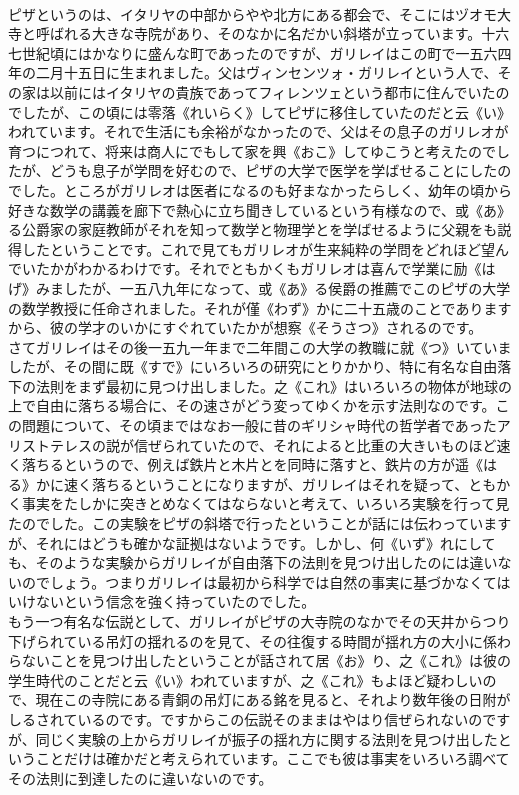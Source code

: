 \documentclass[8pt]{extreport}
\begin{document}
\begin{CJK}{UTF8}{min}
\\	ピザというのは、イタリヤの中部からやや北方にある都会で、そこにはヅオモ大寺と呼ばれる大きな寺院があり、そのなかに名だかい斜塔が立っています。十六七世紀頃にはかなりに盛んな町であったのですが、ガリレイはこの町で一五六四年の二月十五日に生まれました。父はヴィンセンツォ・ガリレイという人で、その家は以前にはイタリヤの貴族であってフィレンツェという都市に住んでいたのでしたが、この頃には零落《れいらく》してピザに移住していたのだと云《い》われています。それで生活にも余裕がなかったので、父はその息子のガリレオが育つにつれて、将来は商人にでもして家を興《おこ》してゆこうと考えたのでしたが、どうも息子が学問を好むので、ピザの大学で医学を学ばせることにしたのでした。ところがガリレオは医者になるのも好まなかったらしく、幼年の頃から好きな数学の講義を廊下で熱心に立ち聞きしているという有様なので、或《あ》る公爵家の家庭教師がそれを知って数学と物理学とを学ばせるように父親をも説得したということです。これで見てもガリレオが生来純粋の学問をどれほど望んでいたかがわかるわけです。それでともかくもガリレオは喜んで学業に励《はげ》みましたが、一五八九年になって、或《あ》る侯爵の推薦でこのピザの大学の数学教授に任命されました。それが僅《わず》かに二十五歳のことでありますから、彼の学才のいかにすぐれていたかが想察《そうさつ》されるのです。
\\	さてガリレイはその後一五九一年まで二年間この大学の教職に就《つ》いていましたが、その間に既《すで》にいろいろの研究にとりかかり、特に有名な自由落下の法則をまず最初に見つけ出しました。之《これ》はいろいろの物体が地球の上で自由に落ちる場合に、その速さがどう変ってゆくかを示す法則なのです。この問題について、その頃まではなお一般に昔のギリシャ時代の哲学者であったアリストテレスの説が信ぜられていたので、それによると比重の大きいものほど速く落ちるというので、例えば鉄片と木片とを同時に落すと、鉄片の方が遥《はる》かに速く落ちるということになりますが、ガリレイはそれを疑って、ともかく事実をたしかに突きとめなくてはならないと考えて、いろいろ実験を行って見たのでした。この実験をピザの斜塔で行ったということが話には伝わっていますが、それにはどうも確かな証拠はないようです。しかし、何《いず》れにしても、そのような実験からガリレイが自由落下の法則を見つけ出したのには違いないのでしょう。つまりガリレイは最初から科学では自然の事実に基づかなくてはいけないという信念を強く持っていたのでした。
\\	もう一つ有名な伝説として、ガリレイがピザの大寺院のなかでその天井からつり下げられている吊灯の揺れるのを見て、その往復する時間が揺れ方の大小に係わらないことを見つけ出したということが話されて居《お》り、之《これ》は彼の学生時代のことだと云《い》われていますが、之《これ》もよほど疑わしいので、現在この寺院にある青銅の吊灯にある銘を見ると、それより数年後の日附がしるされているのです。ですからこの伝説そのままはやはり信ぜられないのですが、同じく実験の上からガリレイが振子の揺れ方に関する法則を見つけ出したということだけは確かだと考えられています。ここでも彼は事実をいろいろ調べてその法則に到達したのに違いないのです。

\end{CJK}
\end{document}
